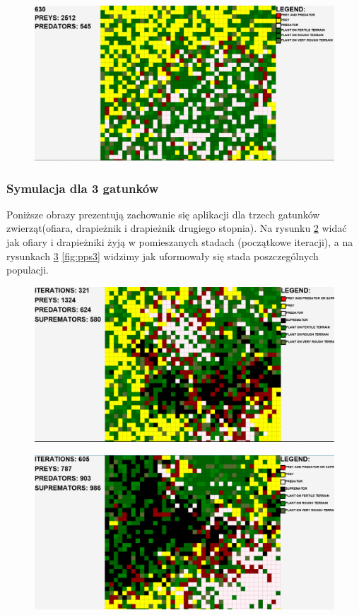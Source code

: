 \begin{figure}[H]
	\centering
	\includegraphics[width=1.0\linewidth]{img/tii2}
	\caption{\label{fig:pp2} }
\end{figure}

\subsubsection{Symulacja dla 3 gatunków}
Poniższe obrazy prezentują zachowanie się aplikacji dla trzech gatunków zwierząt(ofiara, drapieżnik i drapieżnik drugiego stopnia). Na rysunku \ref{fig:pps1} widać jak ofiary i drapieżniki żyją w pomieszanych stadach (początkowe iteracji), a na rysunkach \ref{fig:pps2} \ref{fig:pps3} widzimy jak uformowały się stada poszczególnych populacji.
\begin{figure}[H]
	\centering
	\includegraphics[width=1.0\linewidth]{img/dare}
	\caption{\label{fig:pps1} }
\end{figure}

\begin{figure}[H]
	\centering
	\includegraphics[width=1.0\linewidth]{img/dare2}
	\caption{\label{fig:pps2} }
\end{figure}

